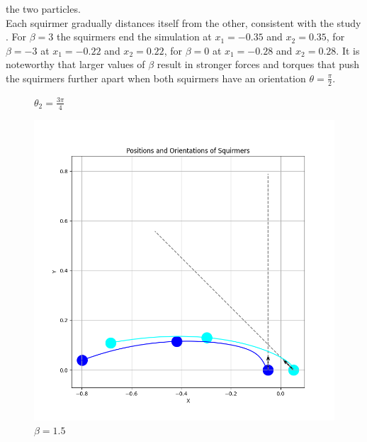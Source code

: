 \documentclass{article}
\begin{document}
 the two particles.\\
Each squirmer gradually distances itself from the other, consistent with the study \cite{Stark}.
For $\beta = 3$ the squirmers end the simulation at $x_1 = -0.35$ and $x_2 = 0.35$,
for $\beta = -3$ at $x_1 = -0.22$ and $x_2 = 0.22$,
 for $\beta = 0$ at $x_1 = -0.28$ and $x_2 = 0.28$.
 It is noteworthy that larger values of $\beta$ result in stronger forces and torques that push the
 squirmers further apart when both squirmers have an orientation $\theta = \frac{\pi}{2}$.
 \begin{figure}[H]
    \centering
    \textbf{$\theta_2 = \frac{3\pi}{4}$}\par\medskip
    \begin{minipage}{0.49\textwidth}
        \includegraphics[width=1.1\textwidth]{graphs/simulations/sim_sq_sq/beta1_5/3pi_4_.png}
        \caption{\footnotesize $\beta = 1.5$}
    \end{minipage}\hfill
    \begin{minipage}{0.49\textwidth}

\end{minipage}
\end{figure}
\end{document}
